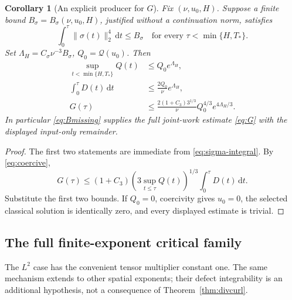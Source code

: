 \documentclass[11pt,a4paper]{article}
\newtheorem{corollary}[theorem]{Corollary}
\theoremstyle{definition}
\theoremstyle{remark}
\newcommand{\Q}{\mathcal Q}
\newcommand{\dd}{\,\mathrm d}
\newcommand{\norm}[1]{\lVert #1\rVert}
\numberwithin{equation}{section}
\begin{document}
\begin{corollary}[An explicit producer for \(G\)]\label{cor:Gproducer}
Fix \((\nu,u_0,H)\). Suppose a finite bound \(B_\sigma=B_\sigma(\nu,u_0,H)\), justified without a continuation norm, satisfies
\begin{equation}\label{eq:Bmissing}
\int_0^\tau\norm{\sigma(t)}_2^4\dd t\le B_\sigma
\quad\text{for every }\tau<\min\{H,T_*\}.
\end{equation}
Set \(\Lambda_H=C_\sigma\nu^{-3}B_\sigma\), \(Q_0=\Q(u_0)\). Then
\begin{align}
\sup_{t<\min\{H,T_*\}}Q(t)&\le Q_0e^{\Lambda_H},\label{eq:Qpositive}\\
\int_0^\tau D(t)\dd t&\le\frac{2Q_0}{\nu}e^{\Lambda_H},\label{eq:Dpositive}\\
G(\tau)&\le
\frac{2(1+C_3)3^{1/3}}{\nu}
Q_0^{4/3}e^{4\Lambda_H/3}.
\label{eq:Gpositive}
\end{align}
In particular \eqref{eq:Bmissing} supplies the full joint-work estimate \eqref{eq:G} with the displayed input-only remainder.
\end{corollary}
\begin{proof}
The first two statements are immediate from \eqref{eq:sigma-integral}. By \eqref{eq:coercive},
\[
G(\tau)\le(1+C_3)(3\sup_{t\le\tau}Q(t))^{1/3}\int_0^\tau D(t)\dd t.
\]
Substitute the first two bounds. If \(Q_0=0\), coercivity gives \(u_0=0\), the selected classical solution is identically zero, and every displayed estimate is trivial.
\end{proof}

\subsection{The full finite-exponent critical family}
The \(L^2\) case has the convenient tensor multiplier constant one. The same mechanism extends to other spatial exponents; their defect integrability is an additional hypothesis, not a consequence of Theorem~\ref{thm:divcurl}.
\end{document}
